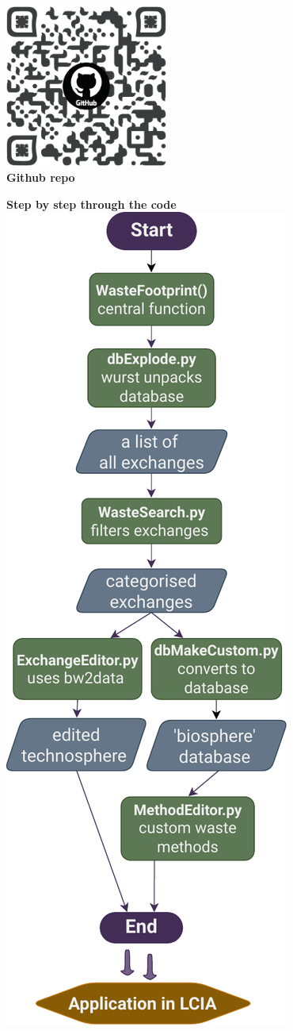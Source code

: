 \documentclass[a0paper,fleqn]{betterposter}
\begin{document}
{\vfill
\begin{center}
\includegraphics[width=0.4\textwidth]{img/qr_code}\\
{\selectfont\textbf{Github repo}}
\end{center}

}{
{\selectfont\textbf{Step by step through the code}}\\

\includegraphics[width=\textwidth]{img/Flowchart_WasteFootprint}
}
\end{document}
